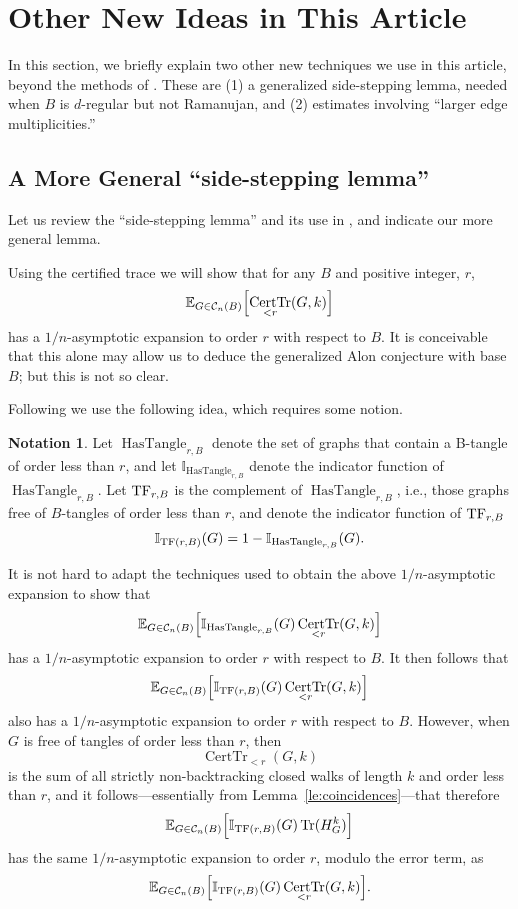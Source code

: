 \documentclass{memo-l}
\newcommand{\TF}{{\rm TF}}
\theoremstyle{plain}
\theoremstyle{definition}
\newtheorem{notation}[theorem]{Notation}
\numberwithin{section}{chapter}
\numberwithin{equation}{chapter}
\DeclareMathOperator{\HasTangle}{HasTangle}
\DeclareMathOperator{\Tr}{Tr}
\DeclareMathOperator{\CertTr}{CertTr}
\theoremstyle{plain}
\theoremstyle{definition}
\newcommand\EE{\mathbb{E}}
\newcommand\II{\mathbb{I}}
\newcommand\cC{\mathcal{C}}
\begin{document}
\section{Other New Ideas in This Article}
\label{se:p0-other}

In this section, we briefly explain two other new techniques we use
in this 
article, beyond the methods of \cite{friedman_alon}.
These are
(1) a generalized side-stepping lemma, needed when $B$ is $d$-regular
but not Ramanujan, and
(2) estimates involving ``larger edge multiplicities.''
 

\subsection{A More General ``side-stepping lemma''}
\label{sb:more_general_side}

Let us review the ``side-stepping lemma'' and its use in
\cite{friedman_alon}, and indicate our more general lemma.

Using the certified trace we will show that for any $B$ and positive
integer, $r$, 
$$
\EE_{G\in\cC_n(B)} \Bigl[ \CertTr_{<r}(G,k) \Bigr]
$$
has a $1/n$-asymptotic expansion to order $r$ with respect to $B$.
It is conceivable that this alone may allow us to deduce the generalized
Alon conjecture with base $B$; but this is not so clear.

Following \cite{friedman_alon} we use the following idea, which requires
some notion.

\begin{notation}
\label{no:has_tangles}
Let
$\HasTangle_{r,B}$
denote the set of graphs that contain a 
\gls{B-tangle} of \gls{order} less than $r$, and
let
$\II_{\HasTangle_{r,B}}$ denote the indicator function of
$\HasTangle_{r,B}$.  Let
$\TF_{r,B}$ is the complement of $\HasTangle_{r,B}$, i.e., those
graphs free of $B$-tangles of order less than $r$, and
denote the indicator function of $\TF_{r,B}$
$$
\II_{\TF(r,B)}(G) = 1 - \II_{\HasTangle_{r,B}}(G).
$$
\end{notation}

It is not hard to adapt the techniques used to obtain the above
$1/n$-asymptotic expansion to show that
$$
\EE_{G\in\cC_n(B)} \Bigl[ \II_{\HasTangle_{r,B}}(G) \CertTr_{<r}(G,k) \Bigr]
$$
has a $1/n$-asymptotic expansion to order $r$ with respect to $B$.
It then follows that 
$$
\EE_{G\in\cC_n(B)} \Bigl[ \II_{\TF(r,B)}(G) \CertTr_{<r}(G,k) \Bigr]
$$
also has a $1/n$-asymptotic expansion to order $r$ with respect to $B$.
However, when $G$ is free of tangles of order less than $r$, then
$$
\CertTr_{<r}(G,k)
$$
is the sum of all strictly non-backtracking closed walks of length $k$
and order less than $r$, and it follows---essentially
from
Lemma~\ref{le:coincidences}---that therefore
$$
\EE_{G\in\cC_n(B)} \Bigl[ \II_{\TF(r,B)}(G) \Tr(H_G^k) \Bigr]
$$
has the same
$1/n$-asymptotic expansion to order $r$, modulo the error term, as 
$$
\EE_{G\in\cC_n(B)} \Bigl[ \II_{\TF(r,B)}(G) \CertTr_{<r}(G,k) \Bigr] .
$$
\end{document}
